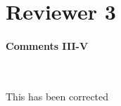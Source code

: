 \documentclass[]{article}
\begin{document}
\section{Reviewer 3}

\paragraph{Comments III-V}

~

This has been corrected

\end{document}
